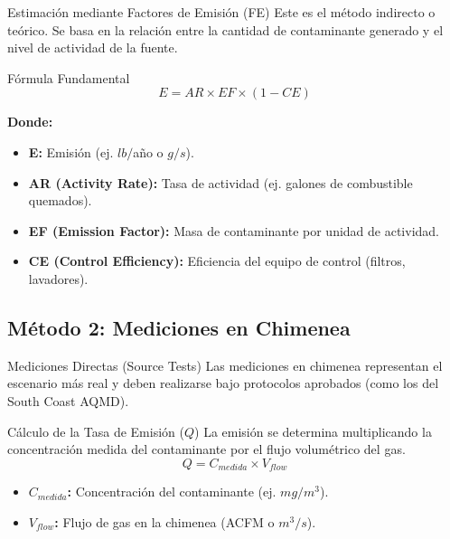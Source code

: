 \documentclass[10pt,compress]{beamer}
\begin{document}
\begin{frame}{Estimación mediante Factores de Emisión (FE)}
    Este es el método indirecto o teórico. Se basa en la relación entre la cantidad de contaminante generado y el nivel de actividad de la fuente.
    
    \begin{alertblock}{Fórmula Fundamental}
        \[ E = AR \times EF \times (1 - CE) \]
    \end{alertblock}
    
    \textbf{Donde:}
    \begin{itemize}
        \item \textbf{E:} Emisión (ej. $lb/$año o $g/s$).
        \item \textbf{AR (Activity Rate):} Tasa de actividad (ej. galones de combustible quemados).
        \item \textbf{EF (Emission Factor):} Masa de contaminante por unidad de actividad.
        \item \textbf{CE (Control Efficiency):} Eficiencia del equipo de control (filtros, lavadores).
    \end{itemize}
\end{frame}

\subsection{Método 2: Mediciones en Chimenea}

\begin{frame}{Mediciones Directas (Source Tests)}
    Las mediciones en chimenea representan el escenario más real y deben realizarse bajo protocolos aprobados (como los del South Coast AQMD).
    
    \begin{block}{Cálculo de la Tasa de Emisión ($Q$)}
        La emisión se determina multiplicando la concentración medida del contaminante por el flujo volumétrico del gas.
        \[ Q = C_{medida} \times V_{flow} \]
    \end{block}
    
    \begin{itemize}
        \item \textbf{$C_{medida}$:} Concentración del contaminante (ej. $mg/m^3$).
        \item \textbf{$V_{flow}$:} Flujo de gas en la chimenea (ACFM o $m^3/s$).
    \end{itemize}
\end{frame}
\end{document}

